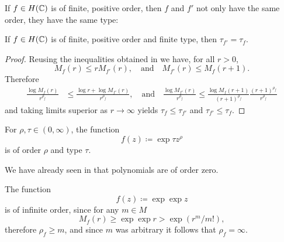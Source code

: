 
If $f \in H(\mathbb{C})$ is of finite, positive order, then $f$ and $f'$ not only have the same order, they have the same type:

\begin{proposition} \label{prop:type-derivative}
    If $f \in H(\mathbb{C})$ is of finite, positive order and finite type, then $\tau_{f'} = \tau_f$.
\end{proposition}

\begin{proof}
    Reusing the inequalities obtained in  we have, for all $r > 0$,
    \begin{equation*}
        M_f(r) \leq r M_{f'}(r), \quad \textrm{and} \quad M_{f'}(r) \leq M_f(r+1).
    \end{equation*}
    Therefore
    \begin{align*}
        \frac{\log M_f(r)}{r^{\rho_f}} &\leq \frac{\log r + \log M_{f'}(r)}{r^{\rho_f}}, \quad \textrm{and} \quad \frac{\log M_{f'}(r)}{r^{\rho_f}} \leq \frac{\log M_{f}(r+1)}{(r+1)^{\rho_f}} \frac{(r+1)^{\rho_f}}{r^{\rho_f}}
    \end{align*}
    and taking limits superior as $r \to \infty$ yields $\tau_f \leq \tau_{f'}$ and $\tau_{f'} \leq \tau_f$.
\end{proof}

\begin{example} \label{exm:order-and-type}
    \leavevmode
    \begin{arrowlist}
        \item For $\rho, \tau \in (0, \infty)$, the function
        $$ f(z) \coloneqq \exp {\tau z^\rho} $$
        is of order $\rho$ and type $\tau$.
        \item We have already seen in  that polynomials are of order zero.
        \item The function
        $$ f(z) \coloneqq \exp \exp z $$
        is of infinite order, since for any $m \in M$
        $$ M_f(r) \geq \exp \exp r > \exp (r^m / m!), $$
        therefore $\rho_f \geq m$, and since $m$ was arbitrary it follows that $\rho_f = \infty$.
        \qedhere
    \end{arrowlist}
\end{example}